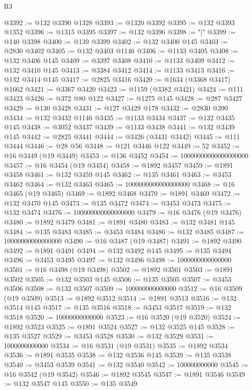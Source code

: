 \begin{lexlean}{R3}
\begin{coremodule}
@3392 := @132 @3390 @1328
@3393 := @1320 @3392
@3395 := @132 @3393 @1352
@3396 := @1315 @3395
@3397 := @132 @3396
@3398 := "]"
@3399 := @140 @3398
@3400 := @139 @3399
@3402 := @132 @3400 @145
@3403 := @2830 @3402
@3405 := @132 @3403 @1146
@3406 := @1133 @3405
@3408 := @132 @3406 @145
@3409 := @3397 @3408
@3410 := @1133 @3409
@3412 := @132 @3410 @145
@3413 := @3384 @3412
@3414 := @1133 @3413
@3416 := @132 @3414 @145
@3417 := @2825 @3416
@3420 := @1634 (@3368 @3417) @1662
@3421 := @3367 @3420
@3423 := @1159 (@3382 @3421)
@3424 := @111 @3423
@3426 := @372 @80 @122
@3427 := @1275 @145
@3428 := @287 @3427
@3429 := @130 @3428
@3431 := @127 @3429 @178
@3432 := @2830 @390
@3434 := @132 @3432 @1146
@3435 := @1133 @3434
@3437 := @132 @3435 @145
@3438 := @3052 @3437
@3439 := @1133 @3438
@3441 := @132 @3439 @145
@3442 := @2825 @3441
@3444 := @3426 (@3431 @3442)
@3445 := @111 @3444
@3446 := @28 @56
@3448 := @121 @3446 @122
@3449 := 52
@3452 := @16 @3449 (@19 @3449)
@3453 := @136 @3452
@3454 := 10000000000000000000
@3457 := @16 @3454 (@19 @3454)
@3458 := @1892 @3457
@3459 := @1891 @3458
@3461 := @132 @3459 @145
@3462 := @135 @3461
@3463 := @3453 @3462
@3464 := @132 @3463
@3465 := 1000000000000000000
@3468 := @16 @3465 (@19 @3465)
@3469 := @1892 @3468
@3470 := @1891 @3469
@3472 := @132 @3470 @145
@3473 := @135 @3472
@3474 := @3453 @3473
@3475 := @132 @3474
@3476 := 100000000000000000
@3479 := @16 @3476 (@19 @3476)
@3480 := @1892 @3479
@3481 := @1891 @3480
@3483 := @132 @3481 @145
@3484 := @135 @3483
@3485 := @3453 @3484
@3486 := @132 @3485
@3487 := 10000000000000000
@3490 := @16 @3487 (@19 @3487)
@3491 := @1892 @3490
@3492 := @1891 @3491
@3494 := @132 @3492 @145
@3495 := @135 @3494
@3496 := @3453 @3495
@3497 := @132 @3496
@3498 := 1000000000000000
@3501 := @16 @3498 (@19 @3498)
@3502 := @1892 @3501
@3503 := @1891 @3502
@3505 := @132 @3503 @145
@3506 := @135 @3505
@3507 := @3453 @3506
@3508 := @132 @3507
@3509 := 100000000000000
@3512 := @16 @3509 (@19 @3509)
@3513 := @1892 @3512
@3514 := @1891 @3513
@3516 := @132 @3514 @145
@3517 := @135 @3516
@3518 := @3453 @3517
@3519 := @132 @3518
@3520 := 10000000000000
@3523 := @16 @3520 (@19 @3520)
@3524 := @1892 @3523
@3525 := @1891 @3524
@3527 := @132 @3525 @145
@3528 := @135 @3527
@3529 := @3453 @3528
@3530 := @132 @3529
@3531 := 1000000000000
@3534 := @16 @3531 (@19 @3531)
@3535 := @1892 @3534
@3536 := @1891 @3535
@3538 := @132 @3536 @145
@3539 := @135 @3538
@3540 := @3453 @3539
@3541 := @132 @3540
@3542 := 100000000000
@3545 := @16 @3542 (@19 @3542)
@3546 := @1892 @3545
@3547 := @1891 @3546
@3549 := @132 @3547 @145
@3550 := @135 @3549

\end{coremodule}
\end{lexlean}
